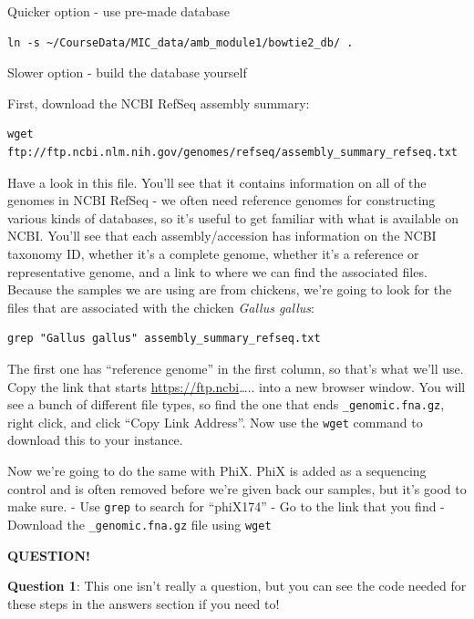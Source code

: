 \documentclass[
]{book}
\newenvironment{bluebox}{
  \definecolor{shadecolor}{RGB}{172, 210, 237}
  \color{white}
  \begin{shaded}}
 {\end{shaded}}
\begin{document}
Quicker option - use pre-made database

\begin{verbatim}
ln -s ~/CourseData/MIC_data/amb_module1/bowtie2_db/ .
\end{verbatim}

Slower option - build the database yourself

First, download the NCBI RefSeq assembly summary:

\begin{verbatim}
wget ftp://ftp.ncbi.nlm.nih.gov/genomes/refseq/assembly_summary_refseq.txt
\end{verbatim}

Have a look in this file. You'll see that it contains information on all of the genomes in NCBI RefSeq - we often need reference genomes for constructing various kinds of databases, so it's useful to get familiar with what is available on NCBI. You'll see that each assembly/accession has information on the NCBI taxonomy ID, whether it's a complete genome, whether it's a reference or representative genome, and a link to where we can find the associated files. Because the samples we are using are from chickens, we're going to look for the files that are associated with the chicken \emph{Gallus gallus}:

\begin{verbatim}
grep "Gallus gallus" assembly_summary_refseq.txt
\end{verbatim}

The first one has ``reference genome'' in the first column, so that's what we'll use. Copy the link that starts \url{https://ftp.ncbi}\ldots.. into a new browser window. You will see a bunch of different file types, so find the one that ends \texttt{\_genomic.fna.gz}, right click, and click ``Copy Link Address''. Now use the \texttt{wget} command to download this to your instance.

Now we're going to do the same with PhiX. PhiX is added as a sequencing control and is often removed before we're given back our samples, but it's good to make sure.
- Use \texttt{grep} to search for ``phiX174''
- Go to the link that you find
- Download the \texttt{\_genomic.fna.gz} file using \texttt{wget}

\begin{bluebox}

\begin{center}
\textbf{QUESTION!}

\end{center}

\textbf{Question 1}: This one isn't really a question, but you can see the code needed for these steps in the answers section if you need to!

\end{bluebox}
\end{document}
